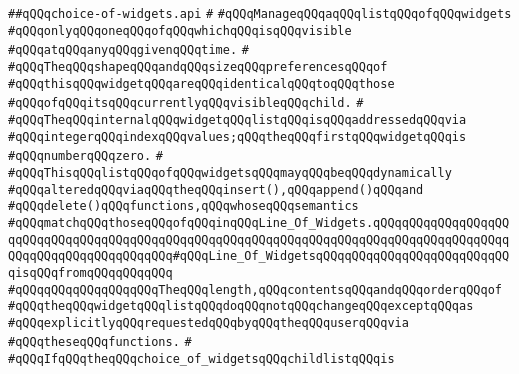 \label{src/lib/x-kit/widget/old/wrapper/choice-of-widgets.api}
\verb|##qQQqchoice-of-widgets.api|\newline
\verb|#|\newline
\verb|#qQQqManageqQQqaqQQqlistqQQqofqQQqwidgets|\newline
\verb|#qQQqonlyqQQqoneqQQqofqQQqwhichqQQqisqQQqvisible|\newline
\verb|#qQQqatqQQqanyqQQqgivenqQQqtime.|\newline
\verb|#|\newline
\verb|#qQQqTheqQQqshapeqQQqandqQQqsizeqQQqpreferencesqQQqof|\newline
\verb|#qQQqthisqQQqwidgetqQQqareqQQqidenticalqQQqtoqQQqthose|\newline
\verb|#qQQqofqQQqitsqQQqcurrentlyqQQqvisibleqQQqchild.|\newline
\verb|#|\newline
\verb|#qQQqTheqQQqinternalqQQqwidgetqQQqlistqQQqisqQQqaddressedqQQqvia|\newline
\verb|#qQQqintegerqQQqindexqQQqvalues;qQQqtheqQQqfirstqQQqwidgetqQQqis|\newline
\verb|#qQQqnumberqQQqzero.|\newline
\verb|#|\newline
\verb|#qQQqThisqQQqlistqQQqofqQQqwidgetsqQQqmayqQQqbeqQQqdynamically|\newline
\verb|#qQQqalteredqQQqviaqQQqtheqQQqinsert(),qQQqappend()qQQqand|\newline
\verb|#qQQqdelete()qQQqfunctions,qQQqwhoseqQQqsemantics|\newline
\verb|#qQQqmatchqQQqthoseqQQqofqQQqinqQQqLine_Of_Widgets.qQQqqQQqqQQqqQQqqQQqqQQqqQQqqQQqqQQqqQQqqQQqqQQqqQQqqQQqqQQqqQQqqQQqqQQqqQQqqQQqqQQqqQQqqQQqqQQqqQQqqQQqqQQqqQQq#qQQqLine_Of_WidgetsqQQqqQQqqQQqqQQqqQQqqQQqqQQqisqQQqfromqQQqqQQqqQQq|\newline
\verb|#qQQqqQQqqQQqqQQqqQQqTheqQQqlength,qQQqcontentsqQQqandqQQqorderqQQqof|\newline
\verb|#qQQqtheqQQqwidgetqQQqlistqQQqdoqQQqnotqQQqchangeqQQqexceptqQQqas|\newline
\verb|#qQQqexplicitlyqQQqrequestedqQQqbyqQQqtheqQQquserqQQqvia|\newline
\verb|#qQQqtheseqQQqfunctions.|\newline
\verb|#|\newline
\verb|#qQQqIfqQQqtheqQQqchoice_of_widgetsqQQqchildlistqQQqis|\newline
